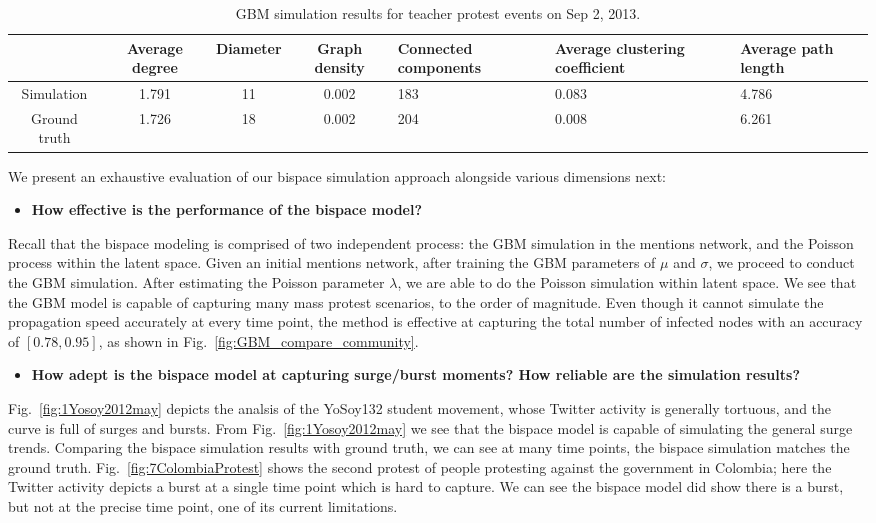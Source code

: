 \begin{table}[!ht]
\tiny
\caption{GBM simulation results for teacher protest events on Sep 2, 2013.}
\centering
\begin{tabular}{|c | c | c | c | p{3cm}<{\centering} | p{2.5cm}<{\centering} | p{2.5cm}<{\centering} |}
\hline
& Average degree & Diameter & Graph density &Connected components& Average clustering coefficient & Average path length  \\ [1ex]
\hline
Simulation& 1.791 & 11&  0.002& 183& 0.083 & 4.786  \\[1ex]
\hline
Ground truth&  1.726 & 18 & 0.002 & 204& 0.008 & 6.261  \\[1ex]
\hline
\end{tabular}
\label{table:simulation_location}
\end{table}


We present an exhaustive evaluation of our bispace simulation approach
alongside various dimensions next:

\begin{itemize}
  \item \textbf{How effective is the performance of the bispace model?}
\end{itemize}
Recall that
the bispace modeling is comprised of
two independent process: the GBM simulation in the mentions network,
and
the Poisson process within the latent space.
Given an initial mentions
network, after training the GBM parameters of $\mu$ and $\sigma$, we proceed to conduct the GBM simulation. After estimating the Poisson parameter $\lambda$, we are able to do the
Poisson simulation within latent space.
We see that the GBM model
is capable of capturing many mass protest scenarios, to the order of magnitude.
Even though it cannot simulate the propagation speed accurately
at every time point, the method is effective at capturing the total
number of infected nodes with an accuracy of $[0.78,0.95]$, as shown
in Fig.~\ref{fig:GBM_compare_community}.

\begin{itemize}
  \item \textbf{How adept is the bispace
model at capturing surge/burst moments?
How reliable are the simulation results?}
\end{itemize}
Fig.~\ref{fig:1Yosoy2012may} depicts the analsis
of the YoSoy132 student movement, whose Twitter activity is generally tortuous, and the curve is full of surges and bursts. From
Fig.~\ref{fig:1Yosoy2012may} we see that the bispace model is
capable of simulating the general surge trends. Comparing
the bispace simulation results with ground truth, we can see
at many time points, the bispace simulation matches the ground truth.
Fig.~\ref{fig:7ColombiaProtest} shows the second protest of people protesting
against the government in Colombia; here
the Twitter activity depicts a burst at a single time point which is
hard to capture. We can see the bispace model did show there is
a burst, but not at the precise
time point, one of its current limitations.


